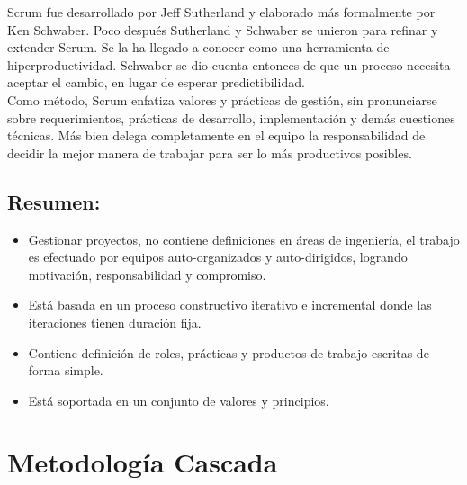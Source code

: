 \documentclass[10pt]{article}
\begin{document}
Scrum fue desarrollado por Jeff Sutherland y elaborado más formalmente por Ken Schwaber. Poco después Sutherland y Schwaber se unieron para refinar y extender Scrum. Se la ha llegado a conocer como una herramienta de hiperproductividad. Schwaber se dio cuenta entonces de que un proceso necesita aceptar el cambio, en lugar de esperar predictibilidad. \\


Como método, Scrum enfatiza valores y prácticas de gestión, sin pronunciarse sobre requerimientos, prácticas de desarrollo, implementación y demás cuestiones técnicas. Más bien delega completamente en el equipo la responsabilidad de decidir la mejor manera de trabajar para ser lo más productivos posibles. \\
\subsection{Resumen:}
\begin{itemize}


\item Gestionar  proyectos, no contiene definiciones en áreas de ingeniería, el trabajo es efectuado por equipos auto-organizados y auto-dirigidos, logrando motivación, responsabilidad y compromiso. 
\item Está basada en un proceso constructivo iterativo e incremental donde las iteraciones tienen duración fija.
\item Contiene definición de roles, prácticas y productos de trabajo escritas de forma simple.
\item Está soportada en un conjunto de valores y principios.
\end{itemize}


\newpage
\section{Metodología Cascada}
\end{document}
